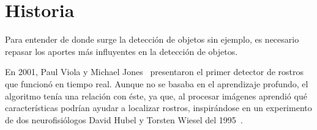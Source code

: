 \section{Historia} \label{sec:historia}

Para entender de donde surge la detección de objetos sin ejemplo, es necesario repasar los aportes más influyentes en la detección de objetos. 

En 2001, Paul Viola y Michael Jones~\cite{viola2001rapid} presentaron el primer detector de rostros que funcionó en tiempo real. Aunque no se basaba en el aprendizaje profundo, el algoritmo tenía una relación con éste, ya que, al procesar imágenes aprendió qué características podrían ayudar a localizar rostros, inspirándose en un experimento de dos neurofisiólogos David Hubel y Torsten Wiesel del 1995~\cite{hubel1959receptive}.

